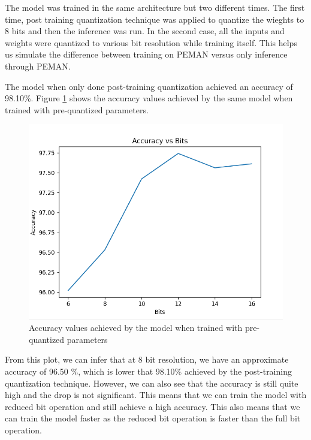 The model was trained in the same architecture but two different times. The first time, post training quantization technique was applied to quantize the wieghts to 8 bits and then the inference was run. In the second case, all the inputs and weights were quantized to various bit resolution while training itself. This helps us simulate the difference between training on PEMAN versus only inference through PEMAN.

The model when only done post-training quantization achieved an accuracy of 98.10\%. Figure \ref{trainingOnPeman} shows the accuracy values achieved by the same model when trained with pre-quantized parameters.

\begin{figure}
	\centering
	\includegraphics[width=\textwidth]{images/trainingOnPeman.png}
	\caption{Accuracy values achieved by the model when trained with pre-quantized parameters}
	\label{trainingOnPeman}
\end{figure}

From this plot, we can infer that at 8 bit resolution, we have an approximate accuracy of 96.50 \%, which is lower that 98.10\% achieved by the post-training quantization technique. However, we can also see that the accuracy is still quite high and the drop is not significant. This means that we can train the model with reduced bit operation and still achieve a high accuracy. This also means that we can train the model faster as the reduced bit operation is faster than the full bit operation.

